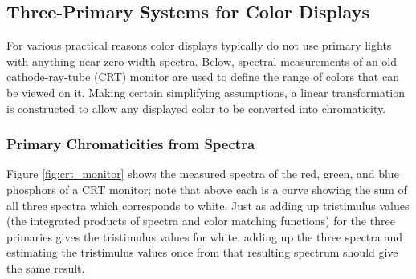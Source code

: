 \documentclass{article}
\begin{document}
\begin{multicols}{2}
\subsection{Three-Primary Systems for Color Displays} %

For various practical reasons color displays typically do not use primary lights with anything near zero-width spectra.  Below, spectral measurements of an old cathode-ray-tube (CRT) monitor are used to define the range of colors that can be viewed on it.  Making certain simplifying assumptions, a linear transformation is constructed to allow any displayed color to be converted into chromaticity.

\subsubsection{Primary Chromaticities from Spectra} %

Figure \ref{fig:crt_monitor} shows the measured spectra of the red, green, and blue phosphors of a CRT monitor; note that above each is a curve showing the sum of all three spectra which corresponds to white.  Just as adding up tristimulus values (the integrated products of spectra and color matching functions) for the three primaries gives the tristimulus values for white, adding up the three spectra and estimating the tristimulus values once from that resulting spectrum should give the same result.


\end{multicols}
\end{document}
